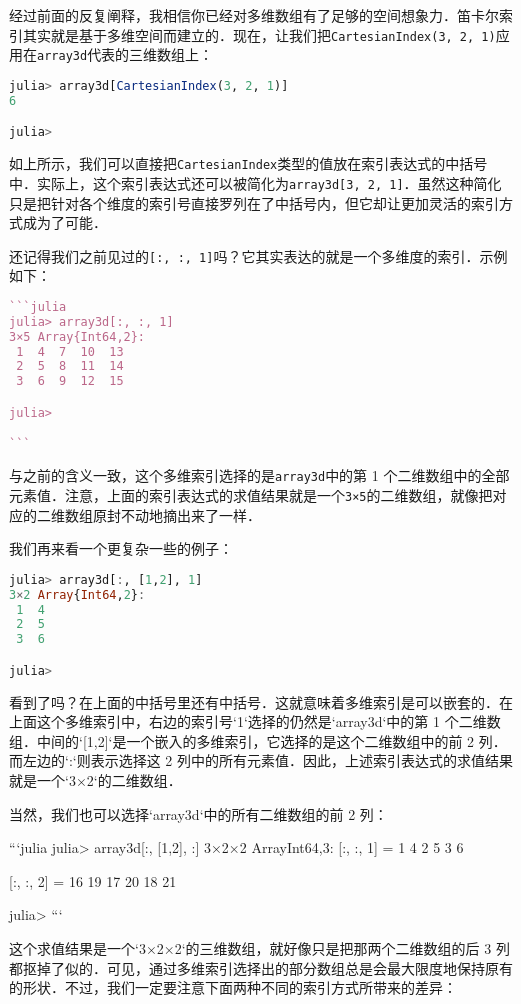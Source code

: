 经过前面的反复阐释，我相信你已经对多维数组有了足够的空间想象力．笛卡尔索引其实就是基于多维空间而建立的．现在，让我们把\verb|CartesianIndex(3, 2, 1)|应用在\verb|array3d|代表的三维数组上：

\begin{lstlisting}[language=julia]
julia> array3d[CartesianIndex(3, 2, 1)]
6

julia>
\end{lstlisting}

如上所示，我们可以直接把\verb|CartesianIndex|类型的值放在索引表达式的中括号中．实际上，这个索引表达式还可以被简化为\verb|array3d[3, 2, 1]|．虽然这种简化只是把针对各个维度的索引号直接罗列在了中括号内，但它却让更加灵活的索引方式成为了可能．

还记得我们之前见过的\verb|[:, :, 1]|吗？它其实表达的就是一个多维度的索引．示例如下：

\begin{lstlisting}[language=julia]
```julia
julia> array3d[:, :, 1]
3×5 Array{Int64,2}:
 1  4  7  10  13
 2  5  8  11  14
 3  6  9  12  15

julia> 

```
\end{lstlisting}

与之前的含义一致，这个多维索引选择的是\verb|array3d|中的第 1 个二维数组中的全部元素值．注意，上面的索引表达式的求值结果就是一个\verb|3×5|的二维数组，就像把对应的二维数组原封不动地摘出来了一样．

我们再来看一个更复杂一些的例子：

\begin{lstlisting}[language=julia]
julia> array3d[:, [1,2], 1]
3×2 Array{Int64,2}:
 1  4
 2  5
 3  6

julia> 
\end{lstlisting}

看到了吗？在上面的中括号里还有中括号．这就意味着多维索引是可以嵌套的．在上面这个多维索引中，右边的索引号`1`选择的仍然是`array3d`中的第 1 个二维数组．中间的`[1,2]`是一个嵌入的多维索引，它选择的是这个二维数组中的前 2 列．而左边的`:`则表示选择这 2 列中的所有元素值．因此，上述索引表达式的求值结果就是一个`3×2`的二维数组．

当然，我们也可以选择`array3d`中的所有二维数组的前 2 列：

```julia
julia> array3d[:, [1,2], :]
3×2×2 Array{Int64,3}:
[:, :, 1] =
 1  4
 2  5
 3  6

[:, :, 2] =
 16  19
 17  20
 18  21

julia> 
```

这个求值结果是一个`3×2×2`的三维数组，就好像只是把那两个二维数组的后 3 列都抠掉了似的．可见，通过多维索引选择出的部分数组总是会最大限度地保持原有的形状．不过，我们一定要注意下面两种不同的索引方式所带来的差异：


